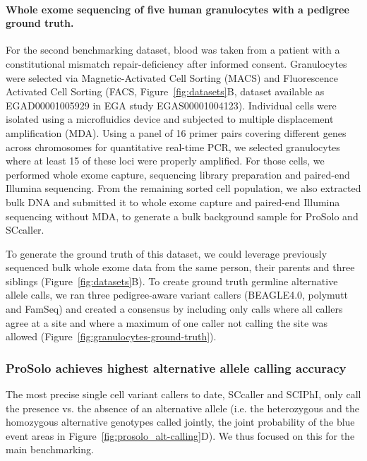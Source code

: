 \documentclass[fleqn,12pt,inline]{wlscirep}
\begin{document}
\paragraph{Whole exome sequencing of five human granulocytes with a pedigree ground truth.}
For the second benchmarking dataset, blood was taken from a patient with a constitutional mismatch repair-deficiency\cite{hoell_constitutional_2014} after informed consent.
Granulocytes were selected via Magnetic-Activated Cell Sorting (MACS) and Fluorescence Activated Cell Sorting (FACS, Figure~\ref{fig:datasets}B, dataset available as \mbox{EGAD00001005929} in EGA study \mbox{EGAS00001004123}).
Individual cells were isolated using a microfluidics device and subjected to multiple displacement amplification (MDA).
Using a panel of 16 primer pairs covering different genes across chromosomes for quantitative real-time PCR, we selected granulocytes where at least 15 of these loci were properly amplified.
For those cells, we performed whole exome capture, sequencing library preparation and paired-end Illumina sequencing.
From the remaining sorted cell population, we also extracted bulk DNA and submitted it to whole exome capture and paired-end Illumina sequencing without MDA, to generate a bulk background sample for ProSolo and SCcaller.

To generate the ground truth of this dataset, we could leverage previously sequenced bulk whole exome data from the same person, their parents and three siblings \cite{hoell_constitutional_2014} (Figure~\ref{fig:datasets}B).
To create ground truth germline alternative allele calls, we ran three pedigree-aware variant callers (BEAGLE4.0\cite{browning_improving_2013}, polymutt\cite{li_likelihood-based_2012} and FamSeq\cite{peng_rare_2013,peng_famseq:_2014}) and created a consensus by including only calls where all callers agree at a site and where a maximum of one caller not calling the site was allowed (Figure~\ref{fig:granulocytes-ground-truth}).

\subsubsection{ProSolo achieves highest alternative allele calling accuracy}

The most precise single cell variant callers to date, SCcaller and SCIPhI, only call the presence vs. the absence of an alternative allele (i.e. the heterozygous and the homozygous alternative genotypes called jointly, the joint probability of the blue event areas in Figure~\ref{fig:prosolo_alt-calling}D).
We thus focused on this for the main benchmarking.
\end{document}
